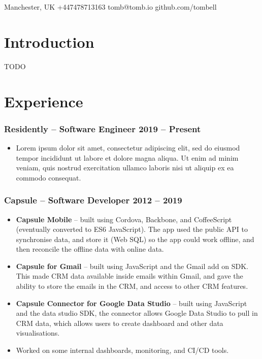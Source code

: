 \documentclass[a4paper]{article}
\author{Tom Bell}
\renewcommand{\maketitle}{
  \begin{center}
    \huge{\textbf\theauthor}
  \end{center}
}
\newcommand{\datedsubsection}[2]{
  \subsubsection{#1 \hfill \textbf{#2}}
}
\begin{document}
\maketitle

\begin{center}
  \raisebox{0\height}{\small\faMapMarker} Manchester, UK
  \hspace{1cm}
  \raisebox{-0.1\height}{\small\faMobile} +447478713163
  \hspace{1cm}
  \raisebox{-0.1\height}{\small\faAt} tomb@tomb.io
  \hspace{1cm}
  \raisebox{-0.1\height}{\small\faGithubAlt} github.com/tombell
\end{center}

\section{Introduction}
\small{TODO}

\section{Experience}
\datedsubsection{\textbf{Residently} -- Software Engineer}{2019 -- Present}
\begin{itemize}
  \item Lorem ipsum dolor sit amet, consectetur adipiscing elit, sed do eiusmod tempor incididunt ut labore et dolore magna aliqua. Ut enim ad minim veniam, quis nostrud exercitation ullamco laboris nisi ut aliquip ex ea commodo consequat.
\end{itemize}
\datedsubsection{\textbf{Capsule} -- Software Developer}{2012 -- 2019}
\begin{itemize}
  \item \textbf{Capsule Mobile} -- built using Cordova, Backbone, and CoffeeScript (eventually converted to ES6 JavaScript). The app used the public API to synchronise data, and store it (Web SQL) so the app could work offline, and then reconcile the offline data with online data.
  \item \textbf{Capsule for Gmail} -- built using JavaScript and the Gmail add on SDK. This made CRM  data available inside emails within Gmail, and gave the ability to store the emails in the CRM, and access to other CRM features.
  \item \textbf{Capsule Connector for Google Data Studio} -- built using JavaScript and the data studio SDK, the connector allows Google Data Studio to pull in CRM data, which allows users to create dashboard and other data visualisations.
  \item Worked on some internal dashboards, monitoring, and CI/CD tools.
\end{itemize}
\end{document}

